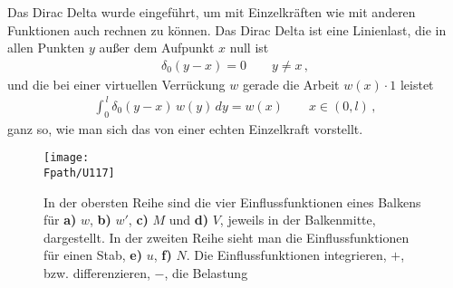 Das Dirac Delta wurde eingef\"{u}hrt, um mit Einzelkr\"{a}ften wie mit anderen Funktionen auch rechnen zu k\"{o}nnen. Das Dirac Delta ist eine Linienlast, die in allen Punkten $y$ au{\ss}er dem Aufpunkt $x$ null ist
\begin{align}
\delta_0(y-x) =  0 \qquad y \neq x\,,
\end{align}
und die bei einer virtuellen Verr\"{u}ckung $w$ gerade die Arbeit $w(x) \cdot 1$ leistet
\begin{align}
\int_0^{\,l} \delta_0(y-x)\, w(y)\,dy = w(x) \qquad x \in (0,l)\,,
\end{align}
ganz so, wie man sich das von einer echten Einzelkraft vorstellt.
\begin{figure}[tbp]
\centering
\if {} \sidecaption \fi
\texttt{[image: \\Fpath/U117]}
\caption{In der obersten Reihe sind die vier Einflussfunktionen eines Balkens f\"{u}r \textbf{ a)} $w$, \textbf{ b)} $w'$, \textbf{ c)} $M $ und \textbf{ d)} $V$, jeweils in der Balkenmitte, dargestellt. In der zweiten Reihe sieht man die Einflussfunktionen f\"{u}r einen Stab, \textbf{ e)} $u$, \textbf{ f)} $N$. Die Einflussfunktionen integrieren, $+ $,  bzw. differenzieren, $-$, die Belastung} \label{U117}
%
\end{figure}%

